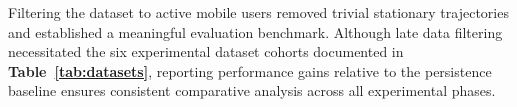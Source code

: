 Filtering the dataset to active mobile users removed trivial stationary trajectories and established a meaningful evaluation benchmark. Although late data filtering necessitated the six experimental dataset cohorts documented in \textbf{Table~\ref{tab:datasets}}, reporting performance gains relative to the persistence baseline ensures consistent comparative analysis across all experimental phases.


